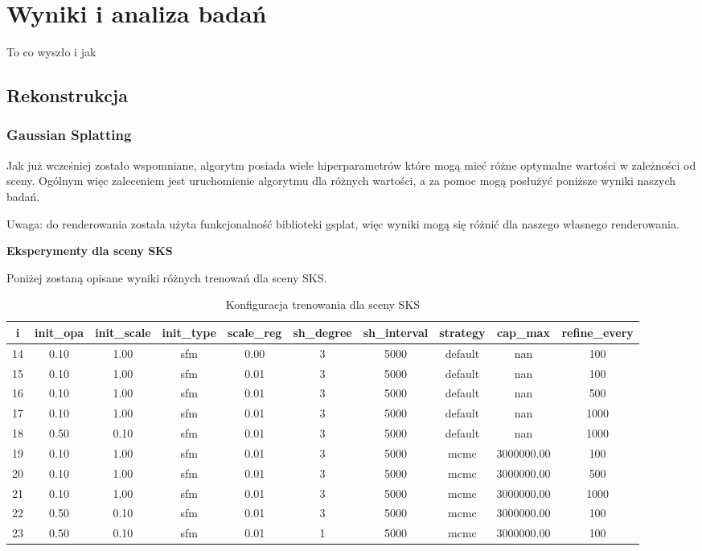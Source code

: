 \section{Wyniki i analiza badań}
To co wyszło i jak

\subsection{Rekonstrukcja}

\subsubsection{Gaussian Splatting}
Jak już wcześniej zostało wspomniane, algorytm posiada wiele hiperparametrów które mogą mieć różne optymalne wartości w zależności od sceny. Ogólnym więc zaleceniem jest uruchomienie algorytmu dla różnych wartości, a za pomoc mogą posłużyć poniższe wyniki naszych badań. 

Uwaga: do renderowania została użyta funkcjonalność biblioteki gsplat, więc wyniki mogą się różnić dla naszego własnego renderowania. 


\textbf{Eksperymenty dla sceny SKS}

Poniżej zostaną opisane wyniki różnych trenowań dla sceny SKS. 

\begin{table}[h]
    \centering
    \begin{tabular}{|c|c|c|c|c|c|c|c|c|c|}
    \hline
    i & init\_opa & init\_scale & init\_type & scale\_reg & sh\_degree & sh\_interval & strategy & cap\_max & refine\_every \\
    \hline
    14 & 0.10 & 1.00 & sfm & 0.00 & 3 & 5000 & default & nan & 100 \\
    \hline
    15 & 0.10 & 1.00 & sfm & 0.01 & 3 & 5000 & default & nan & 100 \\
    \hline
    16 & 0.10 & 1.00 & sfm & 0.01 & 3 & 5000 & default & nan & 500 \\
    \hline
    17 & 0.10 & 1.00 & sfm & 0.01 & 3 & 5000 & default & nan & 1000 \\
    \hline
    18 & 0.50 & 0.10 & sfm & 0.01 & 3 & 5000 & default & nan & 1000 \\
    \hline
    19 & 0.10 & 1.00 & sfm & 0.01 & 3 & 5000 & mcmc & 3000000.00 & 100 \\
    \hline
    20 & 0.10 & 1.00 & sfm & 0.01 & 3 & 5000 & mcmc & 3000000.00 & 500 \\
    \hline
    21 & 0.10 & 1.00 & sfm & 0.01 & 3 & 5000 & mcmc & 3000000.00 & 1000 \\
    \hline
    22 & 0.50 & 0.10 & sfm & 0.01 & 3 & 5000 & mcmc & 3000000.00 & 100 \\
    \hline
    23 & 0.50 & 0.10 & sfm & 0.01 & 1 & 5000 & mcmc & 3000000.00 & 100 \\
    \hline
    \end{tabular}
    \caption{Konfiguracja trenowania dla sceny SKS}
    \label{table:tab_conf_sks}
\end{table}

